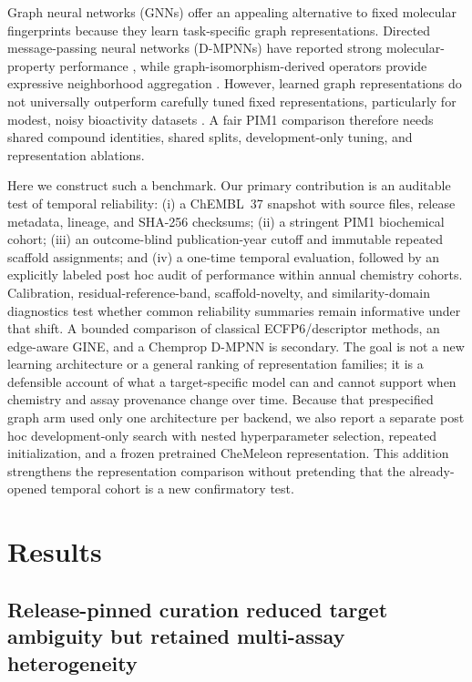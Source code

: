 \documentclass[11pt]{article}
\begin{document}
Graph neural networks (GNNs) offer an appealing alternative to fixed molecular
fingerprints because they learn task-specific graph representations. Directed
message-passing neural networks (D-MPNNs) have reported strong molecular-property
performance \citep{yang2019analyzing}, while graph-isomorphism-derived operators
provide expressive neighborhood aggregation \citep{xu2019powerful,hu2020strategies}.
However, learned graph representations do not universally outperform carefully
tuned fixed representations, particularly for modest, noisy bioactivity datasets
\citep{deng2023systematic}. A fair PIM1 comparison therefore needs shared compound
identities, shared splits, development-only tuning, and representation ablations.

Here we construct such a benchmark. Our primary contribution is an auditable
test of temporal reliability: (i) a ChEMBL~37 snapshot with source files, release
metadata, lineage, and SHA-256 checksums; (ii) a stringent PIM1 biochemical
cohort; (iii) an outcome-blind publication-year cutoff and immutable repeated
scaffold assignments; and (iv) a one-time temporal evaluation, followed by an
explicitly labeled post hoc audit of performance within annual chemistry
cohorts. Calibration, residual-reference-band, scaffold-novelty, and similarity-domain
diagnostics test whether common reliability summaries remain informative under
that shift. A bounded comparison of classical ECFP6/descriptor methods, an
edge-aware GINE, and a Chemprop D-MPNN is secondary. The goal is not a new
learning architecture or a general ranking of representation families; it is a
defensible account of what a target-specific model can and cannot support when
chemistry and assay provenance change over time.
Because that prespecified graph arm used only one architecture per backend, we
also report a separate post hoc development-only search with nested
hyperparameter selection, repeated initialization, and a frozen pretrained
CheMeleon representation. This addition strengthens the representation
comparison without pretending that the already-opened temporal cohort is a new
confirmatory test.

\section{Results}

\subsection{Release-pinned curation reduced target ambiguity but retained multi-assay heterogeneity}
\end{document}
